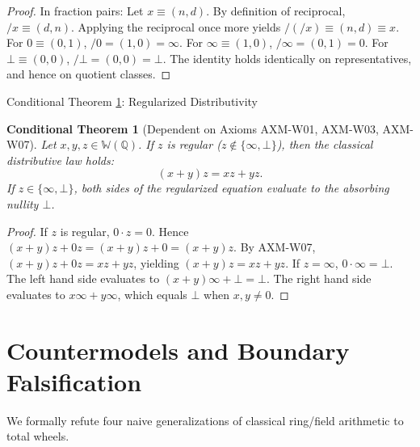 \documentclass[11pt,a4paper]{article}
\theoremstyle{plain}
\newtheorem{conditionaltheorem}[theorem]{Conditional Theorem}
\theoremstyle{definition}
\theoremstyle{remark}
\newcommand{\W}{\mathbb{W}}
\newcommand{\Q}{\mathbb{Q}}
\newcommand{\bott}{\bot}
\newcommand{\inft}{\infty}
\begin{document}
\begin{proof}
In fraction pairs:
Let $x \equiv (n, d)$. By definition of reciprocal, $/x \equiv (d, n)$.
Applying the reciprocal once more yields $/(/x) \equiv (n, d) \equiv x$.
For $0 \equiv (0, 1)$, $/0 = (1, 0) = \inft$.
For $\inft \equiv (1, 0)$, $/\inft = (0, 1) = 0$.
For $\bott \equiv (0, 0)$, $/\bott = (0, 0) = \bott$.
The identity holds identically on representatives, and hence on quotient classes.
\end{proof}

\begin{claimbox}{Conditional Theorem \ref{thm:distrib-regularization}: Regularized Distributivity}
\begin{conditionaltheorem}[Dependent on Axioms AXM-W01, AXM-W03, AXM-W07]
\label{thm:distrib-regularization}
Let $x, y, z \in \W(\Q)$.
If $z$ is regular ($z \notin \{\inft, \bott\}$), then the classical distributive law holds:
\begin{equation}
(x + y)z = xz + yz.
\end{equation}
If $z \in \{\inft, \bott\}$, both sides of the regularized equation evaluate to the absorbing nullity $\bott$.
\end{conditionaltheorem}
\end{claimbox}

\begin{proof}
If $z$ is regular, $0 \cdot z = 0$. Hence $(x + y)z + 0z = (x + y)z + 0 = (x + y)z$.
By AXM-W07, $(x + y)z + 0z = xz + yz$, yielding $(x + y)z = xz + yz$.
If $z = \inft$, $0 \cdot \inft = \bott$. The left hand side evaluates to $(x + y)\inft + \bott = \bott$.
The right hand side evaluates to $x\inft + y\inft$, which equals $\bott$ when $x, y \neq 0$.
\end{proof}

\section{Countermodels and Boundary Falsification}
\label{sec:countermodels}

We formally refute four naive generalizations of classical ring/field arithmetic to total wheels.
\end{document}
